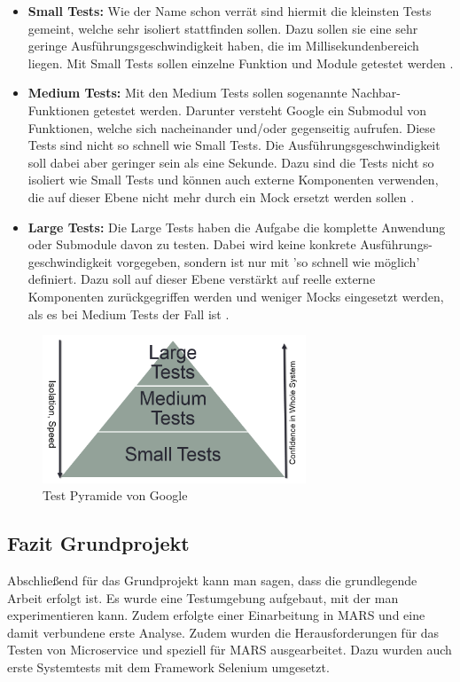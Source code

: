 \documentclass{llncs}
\begin{document}
\begin{itemize}
\item \textbf{Small Tests:} Wie der Name schon verrät sind hiermit die kleinsten Tests gemeint, welche sehr isoliert stattfinden sollen. Dazu sollen sie eine sehr geringe Ausführungsgeschwindigkeit haben, die im Millisekundenbereich liegen. Mit Small Tests sollen einzelne Funktion und Module getestet werden \cite{whittaker2012google}.
\item \textbf{Medium Tests:} Mit den Medium Tests sollen sogenannte Nachbar-Funktionen getestet werden. Darunter versteht Google ein Submodul von Funktionen, welche sich nacheinander und/oder gegenseitig aufrufen. Diese Tests sind nicht so schnell wie Small Tests. Die Ausführungsgeschwindigkeit soll dabei aber geringer sein als eine Sekunde. Dazu sind die Tests nicht so isoliert wie Small Tests und können auch externe Komponenten verwenden, die auf dieser Ebene nicht mehr durch ein Mock ersetzt werden sollen \cite{whittaker2012google}.
\item \textbf{Large Tests:} Die Large Tests haben die Aufgabe die komplette Anwendung oder Submodule davon zu testen. Dabei wird keine konkrete Ausführungs-
geschwindigkeit vorgegeben, sondern ist nur mit 'so schnell wie möglich' definiert. Dazu soll auf dieser Ebene verstärkt auf reelle externe Komponenten zurückgegriffen werden und weniger Mocks eingesetzt werden, als es bei Medium Tests der Fall ist \cite{whittaker2012google}.
\end{itemize}
\begin{figure}[htbp]
  \centering
      \includegraphics[width=0.7\textwidth]{./Images/GooglePyramide.PNG}
    \caption{Test Pyramide von Google}
    \label{fig:PyramideGoogle}
\end{figure}

\subsection{Fazit Grundprojekt}
Abschließend für das Grundprojekt kann man sagen, dass die grundlegende Arbeit erfolgt ist. Es wurde eine Testumgebung aufgebaut, mit der man experimentieren kann. Zudem erfolgte einer Einarbeitung in MARS und eine damit verbundene erste Analyse. Zudem wurden die Herausforderungen für das Testen von Microservice und speziell für MARS ausgearbeitet. Dazu wurden auch erste Systemtests mit dem Framework Selenium umgesetzt.
\end{document}
